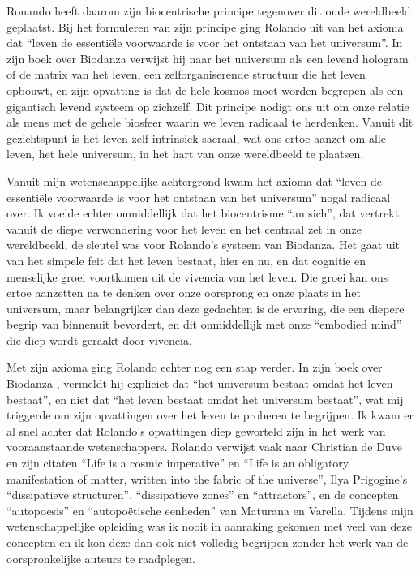 \documentclass[
  11pt,
]{book}
\begin{document}
Ronando heeft daarom zijn biocentrische principe tegenover dit oude wereldbeeld geplaatst. Bij het formuleren van zijn principe ging Rolando uit van het axioma dat ``leven de essentiële voorwaarde is voor het ontstaan van het universum''. In zijn boek over Biodanza \citep{toro2008} verwijst hij naar het universum als een levend hologram of de matrix van het leven, een zelforganiserende structuur die het leven opbouwt, en zijn opvatting is dat de hele kosmos moet worden begrepen als een gigantisch levend systeem op zichzelf. Dit principe nodigt ons uit om onze relatie als mens met de gehele biosfeer waarin we leven radicaal te herdenken. Vanuit dit gezichtspunt is het leven zelf intrinsiek sacraal, wat ons ertoe aanzet om alle leven, het hele universum, in het hart van onze wereldbeeld te plaatsen.

Vanuit mijn wetenschappelijke achtergrond kwam het axioma dat ``leven de essentiële voorwaarde is voor het ontstaan van het universum'' nogal radicaal over. Ik voelde echter onmiddellijk dat het biocentrisme ``an sich'', dat vertrekt vanuit de diepe verwondering voor het leven en het centraal zet in onze wereldbeeld, de sleutel was voor Rolando's systeem van Biodanza. Het gaat uit van het simpele feit dat het leven bestaat, hier en nu, en dat cognitie en menselijke groei voortkomen uit de vivencia van het leven. Die groei kan ons ertoe aanzetten na te denken over onze oorsprong en onze plaats in het universum, maar belangrijker dan deze gedachten is de ervaring, die een diepere begrip van binnenuit bevordert, en dit onmiddellijk met onze ``embodied mind'' die diep wordt geraakt door vivencia.

Met zijn axioma ging Rolando echter nog een stap verder. In zijn boek over Biodanza \citep{toro2008}, vermeldt hij expliciet dat ``het universum bestaat omdat het leven bestaat'', en niet dat ``het leven bestaat omdat het universum bestaat'', wat mij triggerde om zijn opvattingen over het leven te proberen te begrijpen. Ik kwam er al snel achter dat Rolando's opvattingen diep geworteld zijn in het werk van vooraanstaande wetenschappers. Rolando verwijst vaak naar Christian de Duve en zijn citaten ``Life is a cosmic imperative'' en ``Life is an obligatory manifestation of matter, written into the fabric of the universe'', Ilya Prigogine's ``dissipatieve structuren'', ``dissipatieve zones'' en ``attractors'', en de concepten ``autopoesis'' en ``autopoëtische eenheden'' van Maturana en Varella. Tijdens mijn wetenschappelijke opleiding was ik nooit in aanraking gekomen met veel van deze concepten en ik kon deze dan ook niet volledig begrijpen zonder het werk van de oorspronkelijke auteurs te raadplegen.
\end{document}
